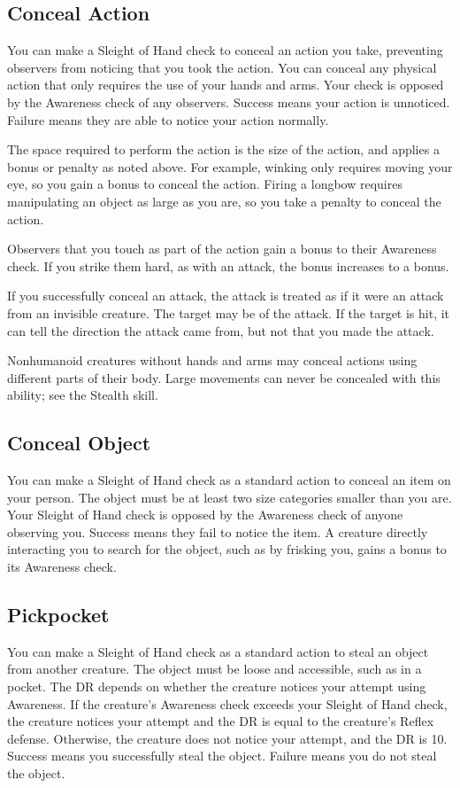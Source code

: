     \subsection{Conceal Action}
        You can make a Sleight of Hand check to conceal an action you take, preventing observers from noticing that you took the action. You can conceal any physical action that only requires the use of your hands and arms. Your check is opposed by the Awareness check of any observers. Success means your action is unnoticed. Failure means they are able to notice your action normally.

        The space required to perform the action is the size of the action, and applies a bonus or penalty as noted above. For example, winking only requires moving your eye, so you gain a  bonus to conceal the action. Firing a longbow requires manipulating an object as large as you are, so you take a  penalty to conceal the action.

        Observers that you touch as part of the action gain a  bonus to their Awareness check. If you strike them hard, as with an attack, the bonus increases to a  bonus.

        If you successfully conceal an attack, the attack is treated as if it were an attack from an invisible creature. The target may be \unaware of the attack. If the target is hit, it can tell the direction the attack came from, but not that you made the attack.

        Nonhumanoid creatures without hands and arms may conceal actions using different parts of their body. Large movements can never be concealed with this ability; see the Stealth skill.

    \subsection{Conceal Object}
        You can make a Sleight of Hand check as a standard action to conceal an item on your person. The object must be at least two size categories smaller than you are. Your Sleight of Hand check is opposed by the Awareness check of anyone observing you. Success means they fail to notice the item. A creature directly interacting you to search for the object, such as by frisking you, gains a  bonus to its Awareness check.

    \subsection{Pickpocket}
        You can make a Sleight of Hand check as a standard action to steal an object from another creature. The object must be loose and accessible, such as in a pocket. The DR depends on whether the creature notices your attempt using Awareness. If the creature's Awareness check exceeds your Sleight of Hand check, the creature notices your attempt and the DR is equal to the creature's Reflex defense. Otherwise, the creature does not notice your attempt, and the DR is 10. Success means you successfully steal the object. Failure means you do not steal the object.

